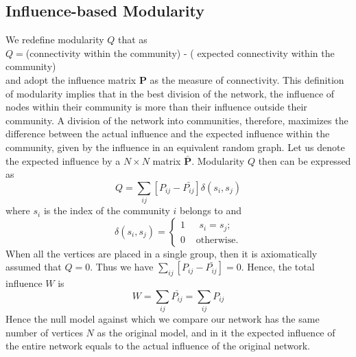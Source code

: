 \documentclass{sig-alternate}
\begin{document}
\subsection{Influence-based Modularity}
We redefine modularity $Q$ that as \\
$Q=$(connectivity within the community) - ( expected connectivity within the community)\\
and adopt the influence matrix $\mathbf{P}$ as the measure of connectivity.
This definition of modularity implies that in the best division of the network, the influence of nodes within their community is more than their influence outside their community. A division of the network into communities, therefore, maximizes the difference between the actual influence and the expected  influence within the community, given by the influence in an equivalent random graph.
Let us denote the expected influence by a $N \times N$ matrix $\mathbf{\bar{P}}$.
Modularity $Q$ then can be expressed as
\begin{equation}
\label{eq: mod2}
Q=\sum_{ij} {[P_{ij} - \bar{P_{ij}}]\delta(s_i, s_j)}
\end{equation}
where $s_i$ is the index of the community $i$ belongs to and 
\[
\delta(s_i, s_j) = \left \{ \begin {array} {ll}
1 & \mbox{ $s_i =s_j$} ; \\
0 & \mbox{ otherwise}.
\end{array}
\right. \]
When all the vertices are placed in a single group, then it is axiomatically assumed that $Q=0$. Thus we have $ \sum_{ij}[P_{ij} - \bar{P_{ij}}] =0$. Hence, the total influence $W$ is
\begin{equation}
\label{eq: mod3}
 W = \sum_{ij} \bar{P_{ij}}=\sum_{ij} P_{ij}
\end{equation}
Hence the null model against which we compare our network has the same number of vertices $N$ as the original model, and in it  the expected influence of the entire network equals to the actual influence of the original network. 
\end{document}
